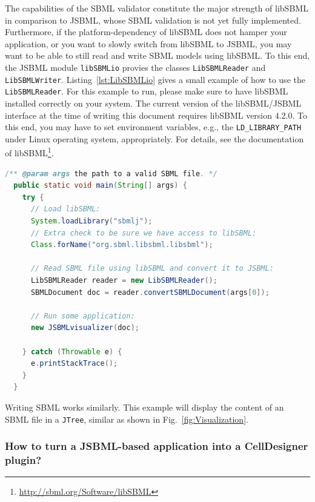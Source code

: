 The capabilities of the SBML validator constitute the
major strength of libSBML \citep{Bornstein2008} in comparison to JSBML, whose
SBML validation is not yet fully implemented. Furthermore, if the
platform-dependency of libSBML does not hamper your application, or you want to
slowly switch from libSBML to JSBML, you may want to be able to still read and
write SBML models using libSBML. To this end, the JSBML module
\texttt{libSBMLio} provies the classes \texttt{LibSBMLReader}
%
and \texttt{LibSBMLWriter}.
%
Listing~\vref{lst:LibSBMLio} gives a small example of how to use the
\texttt{LibSBMLReader}. For this example to run, please make sure to have
libSBML installed correctly on your system. The current version of the
libSBML/JSBML interface at the time of writing this document requires libSBML
version 4.2.0.
%
To this end, you may have to set environment variables, e.g., the
\texttt{LD\_LIBRARY\_PATH}
%
under Linux operating system, appropriately. For
details, see the documentation of
libSBML\footnote{\url{http://sbml.org/Software/libSBML}}.
\begin{lstlisting}[language=Java,float,caption={A simple example for
converting libSBML data structures into JSBML data objects},label=lst:LibSBMLio]
  /** @param args the path to a valid SBML file. */
  public static void main(String[] args) {
    try {
      // Load libSBML:
      System.loadLibrary("sbmlj");
      // Extra check to be sure we have access to libSBML:
      Class.forName("org.sbml.libsbml.libsbml");

      // Read SBML file using libSBML and convert it to JSBML:
      LibSBMLReader reader = new LibSBMLReader();
      SBMLDocument doc = reader.convertSBMLDocument(args[0]);

      // Run some application:
      new JSBMLvisualizer(doc);

    } catch (Throwable e) {
      e.printStackTrace();
    }
  }
\end{lstlisting}
Writing SBML works similarly. This example will display the content of an SBML
file in a \texttt{JTree}, similar as shown in Fig.~\vref{fig:Visualization}.

\subsubsection{How to turn a JSBML-based application into a CellDesigner plugin?}


